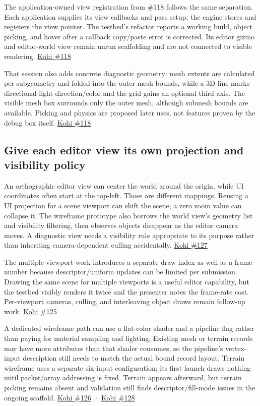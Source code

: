 The application-owned view registration from \#118 follows the same separation. Each application supplies its view callbacks and pass setup; the engine stores and registers the view pointer. The testbed's refactor reports a working build, object picking, and hover after a callback copy/paste error is corrected. Its editor gizmo and editor-world view remain unrun scaffolding and are not connected to visible rendering. \href{https://www.youtube.com/watch?v=CjJqa3iILAQ}{Kohi \#118}

That session also adds concrete diagnostic geometry: mesh extents are calculated per subgeometry and folded into the outer mesh bounds, while a 3D line marks directional-light direction/color and the grid gains an optional third axis. The visible mesh box surrounds only the outer mesh, although submesh bounds are available. Picking and physics are proposed later uses, not features proven by the debug box itself. \href{https://www.youtube.com/watch?v=CjJqa3iILAQ}{Kohi \#118}

\subsection{Give each editor view its own projection and visibility policy}\label{06-engine-ii-ch032-give-each-editor-view-its-own-projection-and-visibility-policy}

An orthographic editor view can center the world around the origin, while UI coordinates often start at the top-left. Those are different mappings. Reusing a UI projection for a scene viewport can shift the scene; a zero zoom value can collapse it. The wireframe prototype also borrows the world view's geometry list and visibility filtering, then observes objects disappear as the editor camera moves. A diagnostic view needs a visibility rule appropriate to its purpose rather than inheriting camera-dependent culling accidentally. \href{https://www.youtube.com/watch?v=5i66-I3x9ug}{Kohi \#127}

The multiple-viewport work introduces a separate draw index as well as a frame number because descriptor/uniform updates can be limited per submission. Drawing the same scene for multiple viewports is a useful editor capability, but the testbed visibly renders it twice and the presenter notes the frame-rate cost. Per-viewport cameras, culling, and interleaving object draws remain follow-up work. \href{https://www.youtube.com/watch?v=7ejRGnfNiU0}{Kohi \#125}

A dedicated wireframe path can use a flat-color shader and a pipeline flag rather than paying for material sampling and lighting. Existing mesh or terrain records may have more attributes than that shader consumes, so the pipeline's vertex-input description still needs to match the actual bound record layout. Terrain wireframe uses a separate six-input configuration; its first launch draws nothing until packet/array addressing is fixed. Terrain appears afterward, but terrain picking remains absent and validation still finds descriptor/fill-mode issues in the ongoing scaffold. \href{https://www.youtube.com/watch?v=xCA1MY94Hh0}{Kohi \#126} · \href{https://www.youtube.com/watch?v=ZTC7Lryt6uQ}{Kohi \#128}

